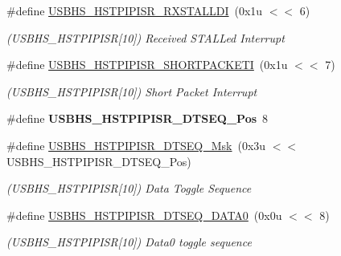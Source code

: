 \begin{DoxyCompactItemize}
\#define \mbox{\hyperlink{group__SAME70__USBHS_ga49bab8fafde4c709dd7decb1c97b0503}{U\+S\+B\+H\+S\+\_\+\+H\+S\+T\+P\+I\+P\+I\+S\+R\+\_\+\+R\+X\+S\+T\+A\+L\+L\+DI}}~(0x1u $<$$<$ 6)
\begin{DoxyCompactList}\small\item\em (U\+S\+B\+H\+S\+\_\+\+H\+S\+T\+P\+I\+P\+I\+SR\mbox{[}10\mbox{]}) Received S\+T\+A\+L\+Led Interrupt \end{DoxyCompactList}\item 
\mbox{\label{group__SAME70__USBHS_ga24f69fdd9e7c0327a46178c23dffba8a}} 
\#define \mbox{\hyperlink{group__SAME70__USBHS_ga24f69fdd9e7c0327a46178c23dffba8a}{U\+S\+B\+H\+S\+\_\+\+H\+S\+T\+P\+I\+P\+I\+S\+R\+\_\+\+S\+H\+O\+R\+T\+P\+A\+C\+K\+E\+TI}}~(0x1u $<$$<$ 7)
\begin{DoxyCompactList}\small\item\em (U\+S\+B\+H\+S\+\_\+\+H\+S\+T\+P\+I\+P\+I\+SR\mbox{[}10\mbox{]}) Short Packet Interrupt \end{DoxyCompactList}\item 
\mbox{\label{group__SAME70__USBHS_ga12da3c3515367b9798455ca8ea4e2796}} 
\#define {\bfseries U\+S\+B\+H\+S\+\_\+\+H\+S\+T\+P\+I\+P\+I\+S\+R\+\_\+\+D\+T\+S\+E\+Q\+\_\+\+Pos}~8
\item 
\mbox{\label{group__SAME70__USBHS_gaa48469a6762c93aca952ebafb652278f}} 
\#define \mbox{\hyperlink{group__SAME70__USBHS_gaa48469a6762c93aca952ebafb652278f}{U\+S\+B\+H\+S\+\_\+\+H\+S\+T\+P\+I\+P\+I\+S\+R\+\_\+\+D\+T\+S\+E\+Q\+\_\+\+Msk}}~(0x3u $<$$<$ U\+S\+B\+H\+S\+\_\+\+H\+S\+T\+P\+I\+P\+I\+S\+R\+\_\+\+D\+T\+S\+E\+Q\+\_\+\+Pos)
\begin{DoxyCompactList}\small\item\em (U\+S\+B\+H\+S\+\_\+\+H\+S\+T\+P\+I\+P\+I\+SR\mbox{[}10\mbox{]}) Data Toggle Sequence \end{DoxyCompactList}\item 
\mbox{\label{group__SAME70__USBHS_gaec96193aa502e7f2702f3165b1dd6ef7}} 
\#define \mbox{\hyperlink{group__SAME70__USBHS_gaec96193aa502e7f2702f3165b1dd6ef7}{U\+S\+B\+H\+S\+\_\+\+H\+S\+T\+P\+I\+P\+I\+S\+R\+\_\+\+D\+T\+S\+E\+Q\+\_\+\+D\+A\+T\+A0}}~(0x0u $<$$<$ 8)
\begin{DoxyCompactList}\small\item\em (U\+S\+B\+H\+S\+\_\+\+H\+S\+T\+P\+I\+P\+I\+SR\mbox{[}10\mbox{]}) Data0 toggle sequence \end{DoxyCompactList}\item 

\end{DoxyCompactItemize}
